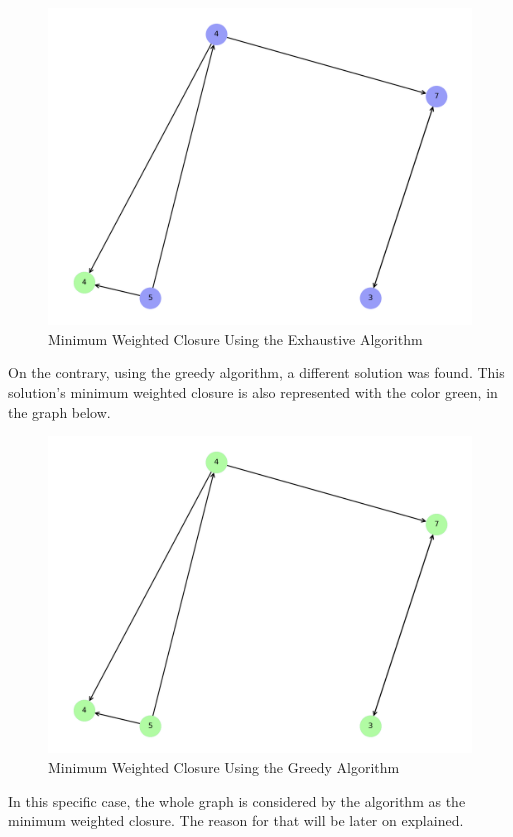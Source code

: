 \documentclass[...]{revdetua}
\begin{document}
\begin{figure}[!htb]
    \centering
    \includegraphics[width=0.75\columnwidth]{./figures/simple_graph_exhaustive_solution.png}
    \caption{Minimum Weighted Closure Using the Exhaustive Algorithm}
    \label{fig:Minimum Weighted Closure Using the Exhaustive Algorithm}
\end{figure}

On the contrary, using the greedy algorithm, a different solution was found. This solution's minimum weighted closure is also represented with the color green, in the graph below.

\begin{figure}[!htb]
    \centering
    \includegraphics[width=0.75\columnwidth]{./figures/simple_graph_greedy_solution.png}
    \caption{Minimum Weighted Closure Using the Greedy Algorithm}
    \label{fig:Minimum Weighted Closure Using the Greedy Algorithm}
\end{figure}

In this specific case, the whole graph is considered by the algorithm as the minimum weighted closure. The reason for that will be later on explained.
\end{document}
